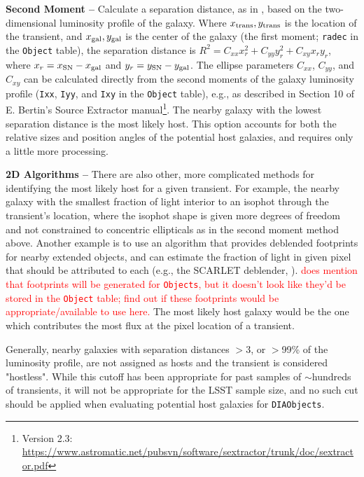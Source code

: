\documentclass[DM,lsstdraft,authoryear,toc]{lsstdoc}
\begin{document}
{\bf Second Moment --} Calculate a separation distance, as in \citet{2006ApJ...648..868S}, based on the two-dimensional luminosity profile of the galaxy.
Where $x_{\rm trans},y_{\rm trans}$ is the location of the transient, and $x_{\rm gal},y_{\rm gal}$ is the center of the galaxy (the first moment; {\tt radec} in the {\tt Object} table), the separation distance is $R^2 = C_{xx} x_r^2 + C_{yy} y_r^2 + C_{xy} x_r y_r$, where $x_r = x_{\rm SN} - x_{\rm gal}$ and $y_r = y_{\rm SN} - y_{\rm gal}$.
The ellipse parameters $C_{xx}$, $C_{yy}$, and $C_{xy}$ can be calculated directly from the second moments of the galaxy luminosity profile ({\tt Ixx}, {\tt Iyy}, and {\tt Ixy} in the {\tt Object} table), e.g., as described in Section 10 of E. Bertin's Source Extractor manual\footnote{Version 2.3: \url{https://www.astromatic.net/pubsvn/software/sextractor/trunk/doc/sextractor.pdf}}.
The nearby galaxy with the lowest separation distance is the most likely host.
This option accounts for both the relative sizes and position angles of the potential host galaxies, and requires only a little more processing. 

{\bf 2D Algorithms --} There are also other, more complicated methods for identifying the most likely host for a given transient.
For example, the nearby galaxy with the smallest fraction of light interior to an isophot through the transient's location, where the isophot shape is given more degrees of freedom and not constrained to concentric ellipticals as in the second moment method above.
Another example is to use an algorithm that provides deblended footprints for nearby extended objects, and can estimate the fraction of light in given pixel that should be attributed to each (e.g., the SCARLET deblender, \cite{2018A&C....24..129M}).
\textcolor{red}{ does mention that footprints will be generated for {\tt Objects}, but it doesn't look like they'd be stored in the {\tt Object} table; find out if these footprints would be appropriate/available to use here.}
The most likely host galaxy would be the one which contributes the most flux at the pixel location of a transient.

Generally, nearby galaxies with separation distances $>$3, or $>$99\% of the luminosity profile, are not assigned as hosts and the transient is considered "hostless".
While this cutoff has been appropriate for past samples of $\sim$hundreds of transients, it will not be appropriate for the LSST sample size, and no such cut should be applied when evaluating potential host galaxies for {\tt DIAObjects}. 
\end{document}
